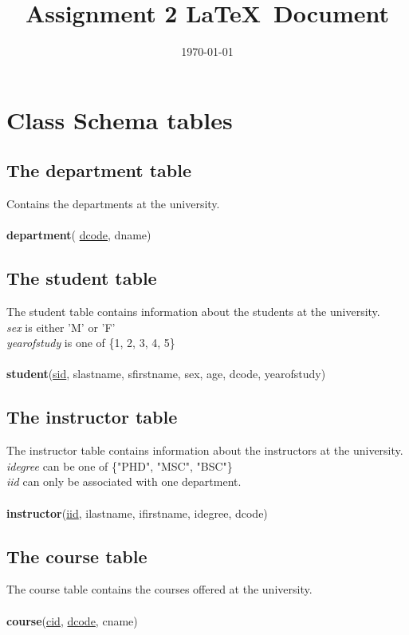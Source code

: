 \documentclass[11pt]{article}
\begin{document}
\title{Assignment 2 \LaTeX \ Document}
\date{\today}
\maketitle


\section{Class Schema tables}

\subsection{The department table}

Contains the departments at the university.\\
~\\
\textbf{department}( \underline{dcode}, dname)

\subsection{The student table}

The student table contains information about the students at the university.\\
\textit{sex} is either 'M' or 'F'\\
\textit{yearofstudy} is one of \{1, 2, 3, 4, 5\}\\
~\\ 
\textbf{student}(\underline{sid}, slastname, sfirstname, sex, age, dcode, yearofstudy)

\subsection{The instructor table}

The instructor table contains information about the instructors at the university.\\
\textit{idegree} can be one of \{"PHD", "MSC", "BSC"\}\\
\textit{iid} can only be associated with one department.\\
~\\
\textbf{instructor}(\underline{iid}, ilastname, ifirstname, idegree, dcode)

\subsection{The course table}
The course table contains the courses offered at the university.\\
~\\
\textbf{course}(\underline{cid}, \underline{dcode},	cname)
\pagebreak
\end{document}
